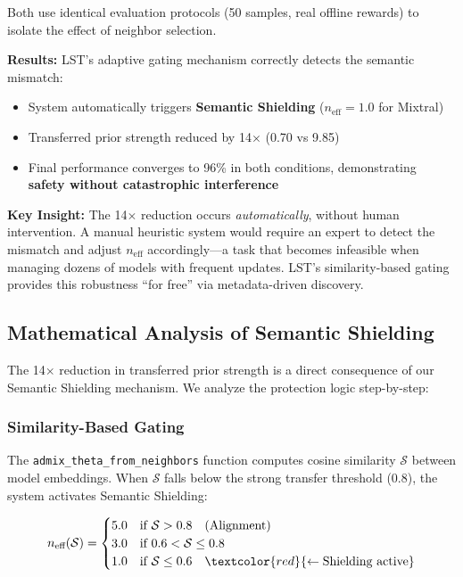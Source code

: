 \documentclass[sigconf,nonacm]{acmart}
\begin{document}
Both use identical evaluation protocols (50 samples, real offline rewards) to isolate the effect of neighbor selection.

\textbf{Results:} LST's adaptive gating mechanism correctly detects the semantic mismatch:
\begin{itemize}
    \item System automatically triggers \textbf{Semantic Shielding} ($n_{\text{eff}} = 1.0$ for Mixtral)
    \item Transferred prior strength reduced by 14$\times$ (0.70 vs 9.85)
    \item Final performance converges to 96\% in both conditions, demonstrating \textbf{safety without catastrophic interference}
\end{itemize}

\textbf{Key Insight:} The 14$\times$ reduction occurs \textit{automatically}, without human intervention. A manual heuristic system would require an expert to detect the mismatch and adjust $n_{\text{eff}}$ accordingly—a task that becomes infeasible when managing dozens of models with frequent updates. LST's similarity-based gating provides this robustness ``for free'' via metadata-driven discovery.

\subsection{Mathematical Analysis of Semantic Shielding}

The 14$\times$ reduction in transferred prior strength is a direct consequence of our Semantic Shielding mechanism. We analyze the protection logic step-by-step:

\subsubsection{Similarity-Based Gating}

The \texttt{admix\_theta\_from\_neighbors} function computes cosine similarity $\mathcal{S}$ between model embeddings. When $\mathcal{S}$ falls below the strong transfer threshold (0.8), the system activates Semantic Shielding:

\begin{equation}
n_{\text{eff}}(\mathcal{S}) = \begin{cases}
5.0 & \text{if } \mathcal{S} > 0.8 \quad \text{(Alignment)} \\
3.0 & \text{if } 0.6 < \mathcal{S} \leq 0.8 \\
1.0 & \text{if } \mathcal{S} \leq 0.6 \quad \textcolor{red}{\leftarrow \text{Shielding active}}
\end{cases}
\end{equation}
\end{document}
